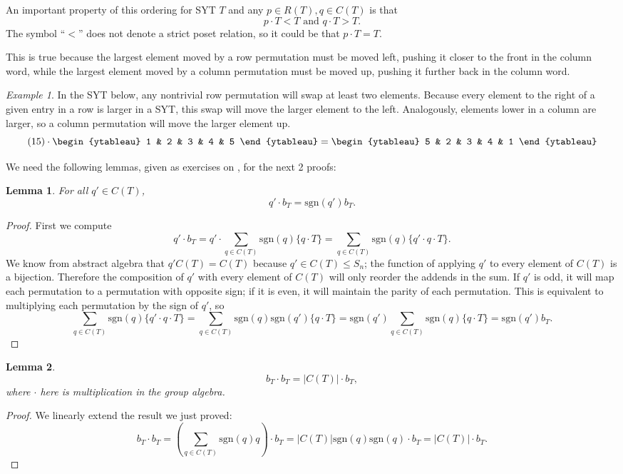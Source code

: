 \documentclass[12pt,twoside]{reedthesis}
\theoremstyle{plain}   %
\newtheorem{lemma}{Lemma}[section]
\theoremstyle{definition}
\theoremstyle{remark}
\newtheorem{ex}{Example}[section]
\numberwithin{equation}{section}
\def\sgn{\mathrm{sgn}}
\begin{document}
  An important property of this ordering for SYT $T$ and any $p \in R(T), q\in C(T)$ is that
  \[ p \cdot T < T \text{ and } q \cdot T > T.\]
  The symbol ``$<$'' does not denote a strict poset relation, so it could be that $p \cdot T = T$. \par
  This is true because the largest element moved by a row permutation must be moved left, pushing it closer to the front in the column word,
  while the largest element moved by a column permutation must be moved up, pushing it further back in the column word.
  \begin{ex}
    In the SYT below, any nontrivial row permutation will swap at least two elements.
    Because every element to the right of a given entry in a row is larger in a SYT, this swap will move the larger element to the left.
    Analogously, elements lower in a column are larger, so a column permutation will move the larger element up.
    \[
      (15) \cdot 
      \begin{ytableau}
        1 & 2 & 3 & 4 & 5 
      \end{ytableau}
      =
      \begin{ytableau}
        5 & 2 & 3 & 4 & 1 
      \end{ytableau}
    \]
  \end{ex}

  We need the following lemmas, given as exercises on \cite[Page 86]{fulton}, for the next 2 proofs:
  \begin{lemma}
    For all $q' \in C(T)$,
    \[q' \cdot b_T = \sgn(q') b_T.\]
  \end{lemma}
  \begin{proof}
    
    First we compute
    \[q' \cdot b_T = q' \cdot \sum_{q \in C(T)} \sgn(q)\{q \cdot T\} = \sum_{q \in C(T)} \sgn(q)\{q' \cdot q \cdot T\}.\]
    We know from abstract algebra that $q' C(T) = C(T)$ because $q' \in C(T) \leq S_n$; the function of applying $q'$ to every element of $C(T)$ is a
    bijection.
    Therefore the composition of $q'$ with every element of $C(T)$ will only reorder the addends in the sum.
    If $q'$ is odd, it will map each permutation to a permutation with opposite sign; if it is even, it will maintain the parity of each permutation.
    This is equivalent to multiplying  each permutation by the sign of $q'$, so
    \[\sum_{q \in C(T)} \sgn(q)\{q' \cdot q \cdot T\} = \sum_{q \in C(T)} \sgn(q)\sgn(q') \{q \cdot T\}
      = \sgn(q') \sum_{q \in C(T)} \sgn(q) \{q \cdot T\} = \sgn(q') b_T.\]
  \end{proof}
  \begin{lemma}
    \[b_T \cdot b_T = |C(T)| \cdot b_T,\] where $\cdot$ here is multiplication in the group algebra.
  \end{lemma}
  \begin{proof}
    We linearly extend the result we just proved:
    \[ b_T \cdot b_T = (\sum_{q \in C(T)} \sgn(q)q) \cdot b_T = |C(T)|\sgn(q)\sgn(q) \cdot b_T = |C(T)| \cdot b_T.\]  
  \end{proof}
\end{document}

